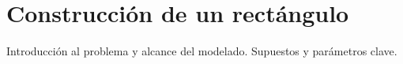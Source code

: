 
\section{Construcción de un rectángulo}\label{sec:06-rectangulo}
Introducción al problema y alcance del modelado.
Supuestos y parámetros clave.
